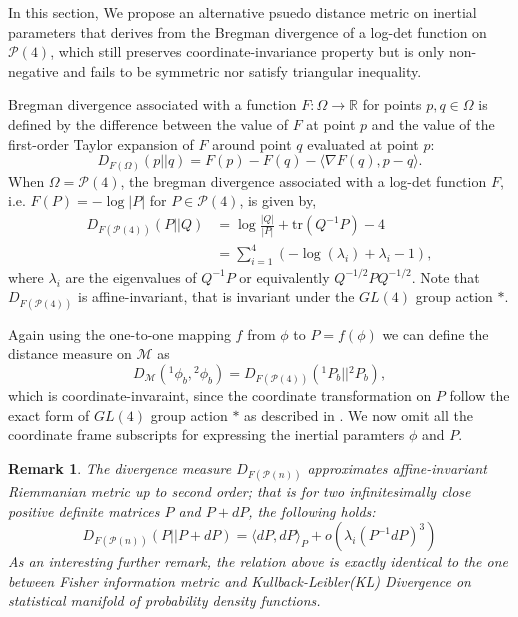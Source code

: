 \documentclass[letterpaper, 10 pt, conference]{ieeeconf}  %
\newtheorem{remark}{Remark}
\begin{document}
In this section, We propose an alternative psuedo distance metric on inertial parameters that derives from the Bregman divergence of a log-det function on $\mathcal{P}(4)$, which still preserves coordinate-invariance property but is only non-negative and fails to be symmetric nor satisfy triangular inequality.

Bregman divergence associated with a function $F: \Omega\rightarrow \mathbb{R}$ for points $p,q\in\Omega$ is defined by the difference between the value of $F$ at point $p$ and the value of the first-order Taylor expansion of $F$ around point $q$ evaluated at point $p$:
\begin{equation*}
D_{F(\Omega)}(p || q) = F(p)-F(q)-\langle\nabla F(q), p-q\rangle.
\end{equation*}
When $\Omega = \mathcal{P}(4)$, the bregman divergence associated with a log-det function $F$, i.e. $F(P) = -\log|P|$ for $P\in\mathcal{P}(4)$, is given by,
\begin{align}
D_{F(\mathcal{P}(4))}(P || Q) &= \log\frac{|Q|}{|P|} + \mathrm{tr}(Q^{-1}P) - 4\\
&= \sum_{i=1}^4(-\log(\lambda_{i})+\lambda_{i}-1),
\end{align}
where $\lambda_i$ are the eigenvalues of $Q^{-1}P$ or equivalently $Q^{-1/2}PQ^{-1/2}$. Note that $D_{F(\mathcal{P}(4))}$ is affine-invariant, that is invariant under the $GL(4)$ group action $*$.

Again using the one-to-one mapping $f$ from $\phi$ to $P = f(\phi)$ we can define the distance measure on $\mathcal{M}$ as
\begin{equation}
D_{\mathcal{M}}({^{1}}\phi_{b}, {^{2}}\phi_{b}) = D_{F(\mathcal{P}(4))}({^{1}}P_{b} ||  {^{2}}P_{b}), \label{Bregman_div}
\end{equation}
which is coordinate-invaraint, since the coordinate transformation on $P$ follow the exact form of $GL(4)$ group action $*$ as described in \cite{Taeyoon_RAL}. We now omit all the coordinate frame subscripts for expressing the inertial paramters $\phi$ and $P$.
\begin{remark}
The divergence measure $D_{F(\mathcal{P}(n))}$ approximates affine-invariant Riemmanian metric up to second order; that is for two infinitesimally close positive definite matrices $P$ and $P +dP$, the following holds:
\begin{equation*}
D_{F(\mathcal{P}(n))}(P || P+dP) = \langle dP,dP \rangle_{P} + o(\lambda_i(P^{-1}dP)^3)
\end{equation*}
As an interesting further remark, the relation above is exactly identical to the one between Fisher information metric and Kullback-Leibler(KL) Divergence on statistical manifold of probability density functions.
\end{remark}
\end{document}
